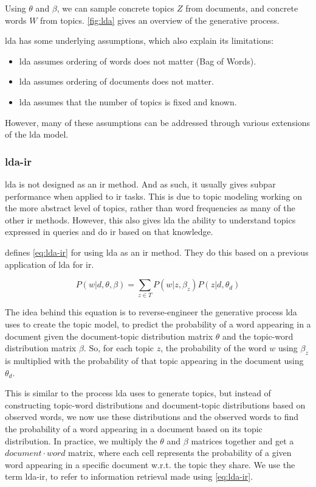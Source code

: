 Using $\theta$ and $\beta$, we can sample concrete topics $Z$ from documents, and concrete words $W$ from topics.
\autoref{fig:lda} gives an overview of the generative process.

\Gls{lda} has some underlying assumptions, which also explain its limitations\cite{blei2012topicmodels}:
\begin{itemize}
	\item \gls{lda} assumes ordering of words does not matter (Bag of Words).
	\item \gls{lda} assumes ordering of documents does not matter.
	\item \gls{lda} assumes that the number of topics is fixed and known.
\end{itemize}
However, many of these assumptions can be addressed through various extensions of the \gls{lda} model\cite{blei2012topicmodels}.

\subsubsection{\gls{lda}-\gls{ir}}\label{subsec:lda_ir}
\gls{lda} is not designed as an \acrlong{ir} method.
And as such, it usually gives subpar performance when applied to \gls{ir} tasks.
This is due to topic modeling working on the more abstract level of topics, rather than word frequencies as many of the other \gls{ir} methods.
However, this also gives \gls{lda} the ability to understand topics expressed in queries and do \gls{ir} based on that knowledge.

\citet{yang2009topic} defines \autoref{eq:lda-ir} for using \gls{lda} as an \gls{ir} method.
They do this based on a previous application of \gls{lda} for \gls{ir}\cite{lda-ir}.

\begin{equation}\label{eq:lda-ir}
	P(w|d, \theta, \beta) = \sum_{z \in T} P(w|z,\beta_z) P(z|d,\theta_d)
\end{equation}

The idea behind this equation is to reverse-engineer the generative process \gls{lda} uses to create the topic model, to predict the probability of a word appearing in a document given the document-topic distribution matrix $\theta$ and the topic-word distribution matrix $\beta$.
So, for each topic $z$, the probability of the word $w$ using $\beta_z$ is multiplied with the probability of that topic appearing in the document using $\theta_d$.

This is similar to the process \gls{lda} uses to generate topics, but instead of constructing topic-word distributions and document-topic distributions based on observed words, we now use these distributions and the observed words to find the probability of a word appearing in a document based on its topic distribution.
In practice, we multiply the $\theta$ and $\beta$ matrices together and get a $document \cdot word$ matrix, where each cell represents the probability of a given word appearing in a specific document w.r.t. the topic they share.
We use the term \gls{lda}-\gls{ir}, to refer to information retrieval made using \autoref{eq:lda-ir}.
